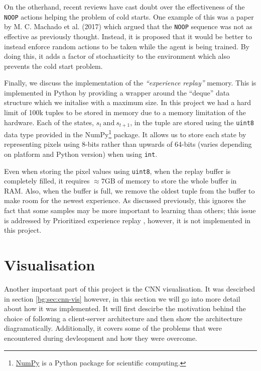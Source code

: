 On the otherhand, recent reviews have cast doubt over the effectiveness of the \texttt{NOOP} actions helping the problem of cold starts. One example of this was a paper by M. C. Machado et al. (2017) \cite{machado2017revisiting} which argued that the \texttt{NOOP} sequence was not as effective as previously thought. Instead, it is proposed that it would be better to instead enforce random actions to be taken while the agent is being trained. By doing this, it adds a factor of stochasticity to the environment which also prevents the cold start problem.

Finally, we discuss the implementation of the \textit{``experience replay''} memory. This is implemented in Python by providing a wrapper around the ``deque'' data structure which we initalise with a maximum size. In this project we had a hard limit of 100k tuples to be stored in memory due to a memory limitation of the hardware. Each of the states, $s_t~\text{and}~s_{t + 1}$, in the tuple are stored using the \texttt{uint8} data type provided in the NumPy\footnote{\href{https://numpy.org/}{NumPy} is a Python package for scientific computing.} package. It allows us to store each state by representing pixels using 8-bits rather than upwards of 64-bits (varies depending on platform and Python version) when using \texttt{int}.

Even when storing the pixel values using \texttt{uint8}, when the replay buffer is completely filled, it requires $\approx 7 \text{GB}$ of memory to store the whole buffer in RAM. Also, when the buffer is full, we remove the oldest tuple from the buffer to make room for the newest experience. As discussed previously, this ignores the fact that some samples may be more important to learning than others; this issue is addressed by Prioritized experience replay \cite{per}, however, it is not implemented in this project.

\section{Visualisation}

Another important part of this project is the CNN visualisation. It was descirbed in section \ref{bg:sec:cnn-vis} however, in this section we will go into more detail about how it was implemented. It will first descirbe the motivation behind the choice of following a client-server architecture and then show the architecture diagramatically. Additionally, it covers some of the problems that were encountered during devleopment and how they were overcome.

